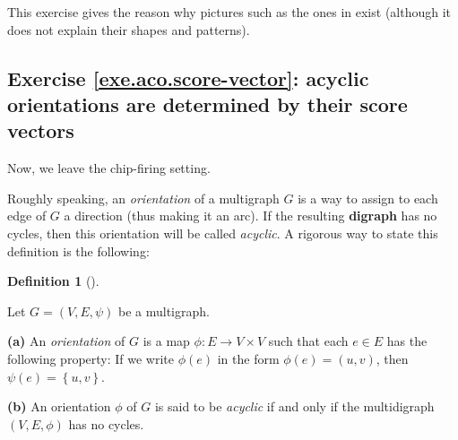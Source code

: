 \documentclass[numbers=enddot,12pt,final,onecolumn,notitlepage]{scrartcl}%
\newcounter{exer}
\theoremstyle{definition}
\newtheorem{defi}[theo]{Definition}
\newenvironment{definition}[1][]
{\begin{defi}[#1]\begin{leftbar}}
{\end{leftbar}\end{defi}}
\newcommand{\set}[1]{\left\{ #1 \right\}}
\newcommand{\tup}[1]{\left( #1 \right)}
\begin{document}
This exercise gives the reason why pictures such as the
ones in \cite{Ellenb15} exist (although it does not
explain their shapes and patterns).

\subsection{Exercise \ref{exe.aco.score-vector}: acyclic
orientations are determined by their score vectors}

Now, we leave the chip-firing setting.

Roughly speaking, an \textit{orientation} of
a multigraph $G$ is a way to assign to each edge of $G$
a direction (thus making it an arc).
If the resulting \textbf{digraph} has no cycles, then
this orientation will be called \textit{acyclic}.
A rigorous way to state this definition is the
following:

\begin{definition} \label{def.aco.aco}
Let $G = \tup{V, E, \psi}$ be a multigraph.

\textbf{(a)} An \textit{orientation} of $G$ is a map
$\phi : E \to V \times V$ such that each $e \in E$
has the following property:
If we write $\phi \tup{e}$ in the form
$\phi \tup{e} = \tup{u, v}$, then
$\psi \tup{e} = \set{u, v}$.

\textbf{(b)} An orientation $\phi$ of $G$ is said to
be \textit{acyclic} if and only if the multidigraph
$\tup{V, E, \phi}$ has no cycles.
\end{definition}
\end{document}
